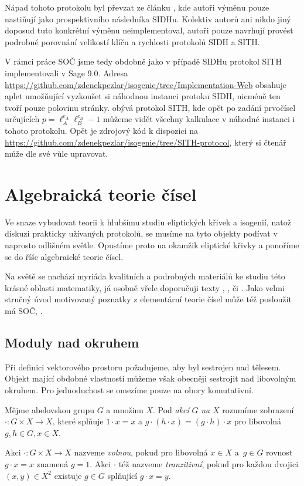 \documentclass[12pt]{report}
\begin{document}
Nápad tohoto protokolu byl převzat ze článku \cite{Dark}, kde autoři výměnu pouze nastiňují jako prospektivního následníka SIDHu. Kolektiv autorů ani nikdo jiný doposud tuto konkrétní výměnu neimplementoval, autoři pouze navrhují provést podrobné porovnání velikostí klíču a rychlosti protokolů SIDH a SITH.

V rámci práce SOČ jsme tedy obdobně jako v případě SIDHu protokol SITH implementovali v Sage 9.0. Adresa \url{https://github.com/zdenekpezlar/isogenie/tree/Implementation-Web} obsahuje aplet umožňující vyzkoušet si náhodnou instanci protoku SIDH, nicméně ten tvoří pouze polovinu stránky.  obývá protokol SITH, kde opět po zadání prvočísel určujících $p = \ell_A ^{e_A} \ell_B ^{e_B} - 1$ můžeme vidět všechny kalkulace v náhodné instanci i tohoto protokolu. Opět je zdrojový kód k dispozici na \url{https://github.com/zdenekpezlar/isogenie/tree/SITH-protocol}, který si čtenář může dle své vůle upravovat.


\chapter{Algebraická teorie čísel}

Ve snaze vybudovat teorii k hlubšímu studiu eliptických křivek a isogenií, natož diskuzi prakticky užívaných protokolů, se musíme na tyto objekty podívat v naprosto odlišném světle. Opustíme proto na okamžik eliptické křivky a ponoříme se do říše algebraické teorie čísel.

Na světě se nachází myriáda kvalitních a podrobných materiálů ke studiu této krásné oblasti matematiky, já osobně vřele doporučuji texty \cite[Ch. XIII]{Chen}, \cite{Ireland}, \cite{Neukirch} či \cite{Pupik}. Jako velmi stručný úvod motivovaný poznatky z elementární teorie čísel může též posloužit má SOČ, \cite{Pezlar}. 

\section{Moduly nad okruhem}

Při definici vektorového prostoru požadujeme, aby byl sestrojen nad tělesem. Objekt mající obdobné vlastnosti můžeme však obecněji sestrojit nad libovolným okruhem. Pro jednoduchost se omezíme pouze na obory komutativní.

\begin{definice}
Mějme abelovskou grupu $G$ a množinu $X$. Pod \textit{akcí} $G$ \textit{na} $X$ rozumíme zobrazení $\cdot : G \times X \longrightarrow X$, které splňuje $1 \cdot x = x$ a $g \cdot (h \cdot x) = (g \cdot h) \cdot x$ pro libovolná $g,h \in G, x \in X$.
\end{definice}
\begin{definice}
Akci $\cdot : G \times X \longrightarrow X$ nazveme \textit{volnou}, pokud pro libovolná $x \in X$ a~$g \in G$ rovnost $g \cdot x = x$ znamená $g = 1$. Akci $\cdot$ též nazveme \textit{tranzitivní}, pokud pro každou dvojici $(x,y) \in X^2$ existuje $g \in G$ splňující $g \cdot x = y$.
\end{definice}
\end{document}
